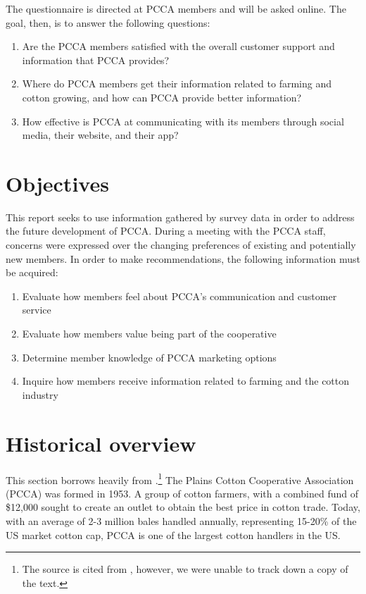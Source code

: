 \documentclass[a4paper]{article}
\begin{document}
The questionnaire is directed at PCCA members and will be asked online. The goal, then, is to answer the following questions:

\begin{enumerate}[noitemsep]
	\item Are the PCCA members satisfied with the overall customer support and information that PCCA provides?
	\item Where do PCCA members get their information related to farming and cotton growing, and how can PCCA provide better information?
	\item How effective is PCCA at communicating with its members through social media, their website, and their app?
\end{enumerate}

\section{Objectives}

This report seeks to use information gathered by survey data in order to address the future development of PCCA. During a meeting with the PCCA staff, concerns were expressed over the changing preferences of existing and potentially new members. In order to make recommendations, the following information must be acquired:
\begin{enumerate}[noitemsep]
	\item Evaluate how members feel about PCCA's communication and customer service
	\item Evaluate how members value being part of the cooperative
	\item Determine member knowledge of PCCA marketing options
	\item Inquire how members receive information related to farming and the cotton industry
\end{enumerate}

\section{Historical overview}
This section borrows heavily from \citet{HistoryPlainsCotton2004}.\footnote{The source is cited from \citet{pedersonInternationalDirectoryCompany2004}, however, we were unable to track down a copy of the text.} The Plains Cotton Cooperative Association (PCCA) was formed in 1953. A group of cotton farmers, with a combined fund of \$12,000 sought to create an outlet to obtain the best price in cotton trade. Today, with an average of 2-3 million bales handled annually, representing 15-20\% of the US market cotton cap, PCCA is one of the largest cotton handlers in the US.
\end{document}
